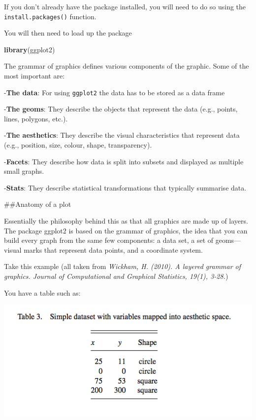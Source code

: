 \documentclass[]{book}
\newenvironment{Shaded}{\begin{snugshade}}{\end{snugshade}}
\newcommand{\KeywordTok}[1]{\textcolor[rgb]{0.13,0.29,0.53}{\textbf{#1}}}
\newcommand{\NormalTok}[1]{#1}
\theoremstyle{definition}
\theoremstyle{definition}
\theoremstyle{definition}
\theoremstyle{remark}
\begin{document}
If you don't already have the package installed, you will need to do so
using the \texttt{install.packages()} function.

You will then need to load up the package

\begin{Shaded}
\begin{Highlighting}[]
\KeywordTok{library}\NormalTok{(ggplot2)                                  }
\end{Highlighting}
\end{Shaded}

The grammar of graphics defines various components of the graphic. Some
of the most important are:

-\textbf{The data}: For using \texttt{ggplot2} the data has to be stored
as a data frame

-\textbf{The geoms}: They describe the objects that represent the data
(e.g., points, lines, polygons, etc.).

-\textbf{The aesthetics}: They describe the visual characteristics that
represent data (e.g., position, size, colour, shape, transparency).

-\textbf{Facets}: They describe how data is split into subsets and
displayed as multiple small graphs.

-\textbf{Stats}: They describe statistical transformations that
typically summarise data.

\#\#Anatomy of a plot

Essentially the philosophy behind this as that all graphics are made up
of layers. The package ggplot2 is based on the grammar of graphics, the
idea that you can build every graph from the same few components: a data
set, a set of geoms---visual marks that represent data points, and a
coordinate system.

Take this example (all taken from \emph{Wickham, H. (2010). A layered
grammar of graphics. Journal of Computational and Graphical Statistics,
19(1), 3-28.})

You have a table such as:

\includegraphics{imgs/table.png}
\end{document}
